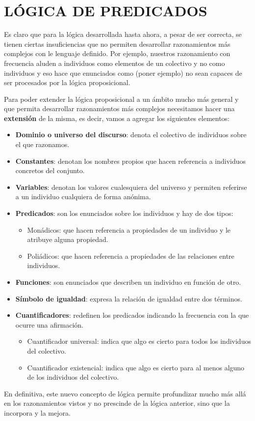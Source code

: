 \documentclass[10pt,a4paper,openright]{book}
\begin{document}
\chapter*{LÓGICA DE PREDICADOS}
Es claro que para la lógica desarrollada hasta ahora, a pesar de ser correcta, se tienen ciertas insuficiencias que no permiten desarrollar razonamientos más complejos con le lenguaje definido. Por ejemplo, nuestros razonamiento con frecuencia aluden a individuos como elementos de un colectivo y no como individuos y eso hace que enunciados como (poner ejemplo) no sean capaces de ser procesados por la lógica proposicional.

Para poder extender la lógica proposicional a un ámbito mucho más general y que permita desarrollar razonamientos más complejos necesitamos hacer una \textbf{extensión} de la misma, es decir, vamos a agregar los siguientes elementos:
\begin{itemize}
\item \textbf{Dominio o universo del discurso}: denota el colectivo de individuos sobre el que razonamos.
\item \textbf{Constantes}: denotan los nombres propios que hacen referencia a individuos concretos del conjunto.
\item \textbf{Variables}: denotan los valores cualesquiera del universo y permiten referirse a un individuo cualquiera de forma anónima.
\item \textbf{Predicados}: son los enunciados sobre los individuos y hay de dos tipos:
	\begin{itemize}
	\item Monádicos: que hacen referencia a propiedades de un individuo y le atribuye alguna propiedad.
	\item Poliádicos: que hacen referencia a propiedades de las relaciones entre individuos.
	\end{itemize}

\item \textbf{Funciones}: son enunciados que describen un individuo en función de otro.

\item \textbf{Símbolo de igualdad}: expresa la relación de igualdad entre dos términos.

\item \textbf{Cuantificadores}: redefinen los predicados indicando la frecuencia con la que ocurre una afirmación.
	\begin{itemize}
	\item Cuantificador universal: indica que algo es cierto para todos los individuos del colectivo.
	\item Cuantificador existencial: indica que algo es cierto para al menos alguno de los individuos del colectivo.
	\end{itemize}
\end{itemize}
En definitiva, este nuevo concepto de lógica permite profundizar mucho más allá en los razonamientos vistos y no prescinde de la lógica anterior, sino que la incorpora y la mejora.
\end{document}
